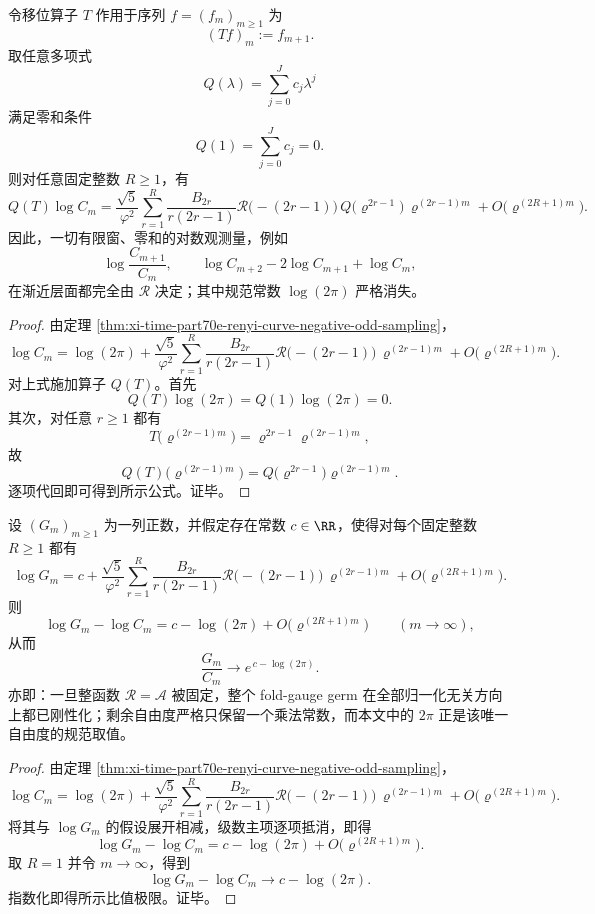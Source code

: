 \begin{theorem}[零和有限窗对数观测的热力学全决定性]\label{thm:xi-time-part70e-zero-sum-window-thermo-determinacy}
令移位算子 \(T\) 作用于序列 \(f=(f_m)_{m\ge 1}\) 为
\[
(Tf)_m:=f_{m+1}.
\]
取任意多项式
\[
Q(\lambda)=\sum_{j=0}^{J}c_j\lambda^j
\]
满足零和条件
\[
Q(1)=\sum_{j=0}^{J}c_j=0.
\]
则对任意固定整数 \(R\ge 1\)，有
\[
Q(T)\log C_m
=
\frac{\sqrt5}{\varphi^2}
\sum_{r=1}^{R}
\frac{B_{2r}}{r(2r-1)}
\mathcal R\bigl(-(2r-1)\bigr)\,
Q\!\bigl(\varrho^{2r-1}\bigr)\,
\varrho^{(2r-1)m}
+
O\!\bigl(\varrho^{(2R+1)m}\bigr).
\]
因此，一切有限窗、零和的对数观测量，例如
\[
\log\frac{C_{m+1}}{C_m},
\qquad
\log C_{m+2}-2\log C_{m+1}+\log C_m,
\]
在渐近层面都完全由 \(\mathcal R\) 决定；其中规范常数 \(\log(2\pi)\) 严格消失。
\end{theorem}
\begin{proof}
由定理 \ref{thm:xi-time-part70e-renyi-curve-negative-odd-sampling}，
\[
\log C_m
=
\log(2\pi)
+
\frac{\sqrt5}{\varphi^2}
\sum_{r=1}^{R}
\frac{B_{2r}}{r(2r-1)}
\mathcal R\bigl(-(2r-1)\bigr)\,
\varrho^{(2r-1)m}
+
O\!\bigl(\varrho^{(2R+1)m}\bigr).
\]
对上式施加算子 \(Q(T)\)。首先
\[
Q(T)\log(2\pi)=Q(1)\log(2\pi)=0.
\]
其次，对任意 \(r\ge 1\) 都有
\[
T\bigl(\varrho^{(2r-1)m}\bigr)=\varrho^{2r-1}\varrho^{(2r-1)m},
\]
故
\[
Q(T)\bigl(\varrho^{(2r-1)m}\bigr)
=
Q\!\bigl(\varrho^{2r-1}\bigr)\varrho^{(2r-1)m}.
\]
逐项代回即可得到所示公式。证毕。
\end{proof}

\begin{theorem}\label{thm:xi-time-part70e-stokes-normalization-rigidity}
设 \((G_m)_{m\ge 1}\) 为一列正数，并假定存在常数 \(c\in\RR\)，使得对每个固定整数 \(R\ge 1\) 都有
\[
\log G_m
=
c+
\frac{\sqrt5}{\varphi^2}
\sum_{r=1}^{R}
\frac{B_{2r}}{r(2r-1)}
\mathcal R\bigl(-(2r-1)\bigr)\,
\varrho^{(2r-1)m}
+
O\!\bigl(\varrho^{(2R+1)m}\bigr).
\]
则
\[
\log G_m-\log C_m
=
c-\log(2\pi)+O\!\bigl(\varrho^{(2R+1)m}\bigr)
\qquad (m\to\infty),
\]
从而
\[
\frac{G_m}{C_m}\longrightarrow e^{\,c-\log(2\pi)}.
\]
亦即：一旦整函数 \(\mathcal R=\mathcal A\) 被固定，整个 fold-gauge germ 在全部归一化无关方向上都已刚性化；剩余自由度严格只保留一个乘法常数，而本文中的 \(2\pi\) 正是该唯一自由度的规范取值。
\end{theorem}
\begin{proof}
由定理 \ref{thm:xi-time-part70e-renyi-curve-negative-odd-sampling}，
\[
\log C_m
=
\log(2\pi)+
\frac{\sqrt5}{\varphi^2}
\sum_{r=1}^{R}
\frac{B_{2r}}{r(2r-1)}
\mathcal R\bigl(-(2r-1)\bigr)\,
\varrho^{(2r-1)m}
+
O\!\bigl(\varrho^{(2R+1)m}\bigr).
\]
将其与 \(\log G_m\) 的假设展开相减，级数主项逐项抵消，即得
\[
\log G_m-\log C_m
=
c-\log(2\pi)+O\!\bigl(\varrho^{(2R+1)m}\bigr).
\]
取 \(R=1\) 并令 \(m\to\infty\)，得到
\[
\log G_m-\log C_m\to c-\log(2\pi).
\]
指数化即得所示比值极限。证毕。
\end{proof}


